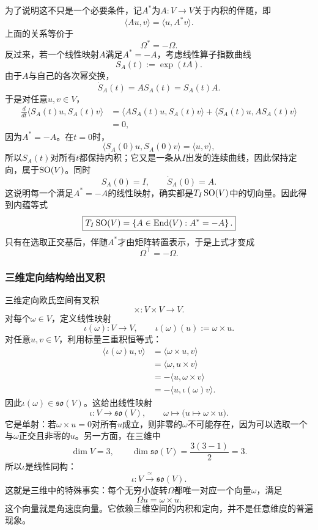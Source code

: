 为了说明这不只是一个必要条件，记$A^\ast$为$A:V\to V$关于内积的伴随，即
\[
    \langle Au,v\rangle=\langle u,A^\ast v\rangle.
\]
上面的关系等价于
\[
    \Omega^\ast=-\Omega.
\]
反过来，若一个线性映射$A$满足$A^\ast=-A$，考虑线性算子指数曲线
\[
    S_A(t):=\exp(tA).
\]
由于$A$与自己的各次幂交换，
\[
    \dot S_A(t)=AS_A(t)=S_A(t)A.
\]
于是对任意$u,v\in V$，
\[
\begin{aligned}
    \frac{d}{dt}\langle S_A(t)u,S_A(t)v\rangle
    &=
    \langle AS_A(t)u,S_A(t)v\rangle
    +\langle S_A(t)u,AS_A(t)v\rangle\\
    &=0,
\end{aligned}
\]
因为$A^\ast=-A$。在$t=0$时，
\[
    \langle S_A(0)u,S_A(0)v\rangle
    =\langle u,v\rangle,
\]
所以$S_A(t)$对所有$t$都保持内积；它又是一条从$I$出发的连续曲线，因此保持定向，属于$\operatorname{SO}(V)$。同时
\[
    S_A(0)=I,
    \qquad
    \dot S_A(0)=A.
\]
这说明每一个满足$A^\ast=-A$的线性映射，确实都是$T_I\operatorname{SO}(V)$中的切向量。因此得到内蕴等式
\[
    \boxed{
    T_I\operatorname{SO}(V)
    =
    \left\{
    A\in\operatorname{End}(V):A^\ast=-A
    \right\}.
    }
\]
只有在选取正交基后，伴随$A^\ast$才由矩阵转置表示，于是上式才变成
\[
    \Omega^\top=-\Omega.
\]

\subsubsection*{三维定向结构给出叉积}

三维定向欧氏空间有叉积
\[
    \times:V\times V\to V.
\]
对每个$\omega\in V$，定义线性映射
\[
    \iota(\omega):V\to V,
    \qquad
    \iota(\omega)(u):=\omega\times u.
\]
对任意$u,v\in V$，利用标量三重积恒等式：
\[
\begin{aligned}
    \langle\iota(\omega)u,v\rangle
    &=\langle\omega\times u,v\rangle\\
    &=\langle\omega,u\times v\rangle\\
    &=-\langle u,\omega\times v\rangle\\
    &=-\langle u,\iota(\omega)v\rangle.
\end{aligned}
\]
因此$\iota(\omega)\in\mathfrak{so}(V)$。这给出线性映射
\[
    \iota:V\to\mathfrak{so}(V),
    \qquad
    \omega\mapsto\bigl(u\mapsto\omega\times u\bigr).
\]
它是单射：若$\omega\times u=0$对所有$u$成立，则非零的$\omega$不可能存在，因为可以选取一个与$\omega$正交且非零的$u$。另一方面，在三维中
\[
    \dim V=3,
    \qquad
    \dim\mathfrak{so}(V)=\frac{3(3-1)}2=3.
\]
所以$\iota$是线性同构：
\[
    \boxed{
    \iota:V\xrightarrow{\ \simeq\ }\mathfrak{so}(V).
    }
\]
这就是三维中的特殊事实：每个无穷小旋转$\Omega$都唯一对应一个向量$\omega$，满足
\[
    \Omega u=\omega\times u.
\]
这个向量就是角速度向量。它依赖三维空间的内积和定向，并不是任意维度的普遍现象。


